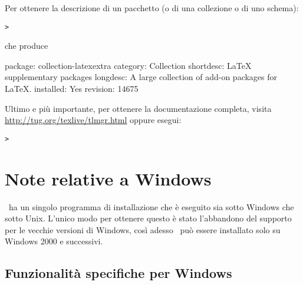 \documentclass{article}
\begin{document}
Per ottenere la descrizione di un pacchetto (o di una collezione o di uno
schema):
\begin{alltt}
> 
\end{alltt}
che produce
\begin{fverbatim}
package:    collection-latexextra
category:   Collection
shortdesc:  LaTeX supplementary packages
longdesc:   A large collection of add-on packages for LaTeX.
installed:  Yes
revision:   14675
\end{fverbatim}

Ultimo e più importante, per ottenere la documentazione completa, visita
\url{http://tug.org/texlive/tlmgr.html} oppure esegui:
\begin{alltt}
> 
\end{alltt}


\section{Note relative a Windows}
\label{sec:windows}

\TL\ ha un singolo programma di installazione che è eseguito sia sotto
Windows che sotto Unix. L'unico modo per ottenere questo è stato
l'abbandono del supporto per le vecchie versioni di Windows, così adesso
\TL\ può essere installato solo su Windows 2000 e successivi.


\subsection{Funzionalità specifiche per Windows}
\label{sec:winfeatures}
\end{document}
